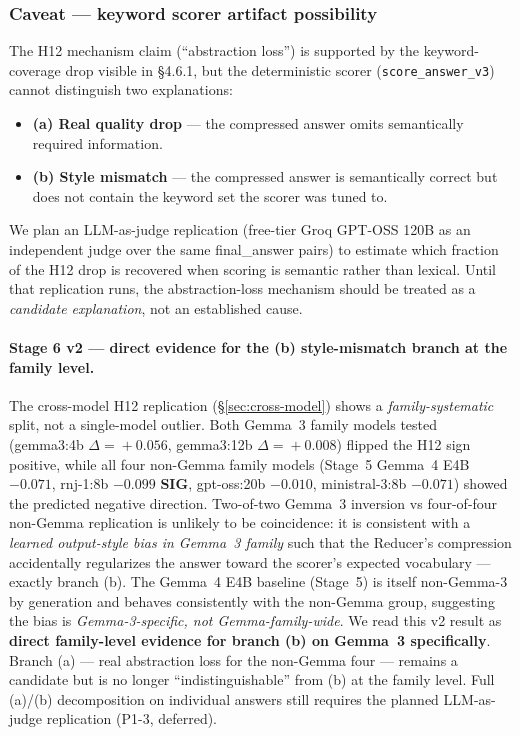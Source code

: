 \documentclass[11pt]{article}
\newcommand{\code}[1]{\texttt{#1}}
\newcommand{\sig}{\textbf{SIG}}
\begin{document}
\subsubsection{Caveat --- keyword scorer artifact possibility}\label{sec:caveat}

The H12 mechanism claim (``abstraction loss'') is supported by the keyword-coverage drop visible in \S4.6.1, but the deterministic scorer (\code{score\_answer\_v3}) cannot distinguish two explanations:

\begin{itemize}[leftmargin=*]
\item \textbf{(a) Real quality drop} --- the compressed answer omits semantically required information.
\item \textbf{(b) Style mismatch} --- the compressed answer is semantically correct but does not contain the keyword set the scorer was tuned to.
\end{itemize}

We plan an LLM-as-judge replication (free-tier Groq GPT-OSS 120B as an independent judge over the same final\_answer pairs) to estimate which fraction of the H12 drop is recovered when scoring is semantic rather than lexical. Until that replication runs, the abstraction-loss mechanism should be treated as a \emph{candidate explanation}, not an established cause.

\paragraph{Stage 6 v2 --- direct evidence for the (b) style-mismatch branch at the family level.}
The cross-model H12 replication (\S\ref{sec:cross-model}) shows a \emph{family-systematic} split, not a single-model outlier. Both Gemma~3 family models tested (gemma3:4b $\Delta\!=\!+0.056$, gemma3:12b $\Delta\!=\!+0.008$) flipped the H12 sign positive, while all four non-Gemma family models (Stage~5 Gemma~4 E4B $-0.071$, rnj-1:8b $-0.099$ \sig, gpt-oss:20b $-0.010$, ministral-3:8b $-0.071$) showed the predicted negative direction. Two-of-two Gemma~3 inversion vs four-of-four non-Gemma replication is unlikely to be coincidence: it is consistent with a \emph{learned output-style bias in Gemma~3 family} such that the Reducer's compression accidentally regularizes the answer toward the scorer's expected vocabulary --- exactly branch (b). The Gemma~4 E4B baseline (Stage~5) is itself non-Gemma-3 by generation and behaves consistently with the non-Gemma group, suggesting the bias is \emph{Gemma-3-specific, not Gemma-family-wide}. We read this v2 result as \textbf{direct family-level evidence for branch (b) on Gemma~3 specifically}. Branch (a) --- real abstraction loss for the non-Gemma four --- remains a candidate but is no longer ``indistinguishable'' from (b) at the family level. Full (a)/(b) decomposition on individual answers still requires the planned LLM-as-judge replication (P1-3, deferred).
\end{document}
